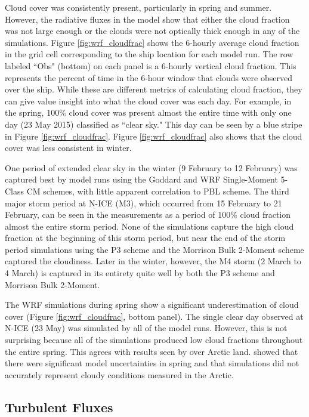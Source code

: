 Cloud cover was consistently present, particularly in spring and summer. However, the radiative fluxes in the model show that either the cloud fraction was not large enough or the clouds were not optically thick enough in any of the simulations. Figure \ref{fig:wrf_cloudfrac} shows the 6-hourly average cloud fraction in the grid cell corresponding to the ship location for each model run. The row labeled ``Obs" (bottom) on each panel is a 6-hourly vertical cloud fraction. This represents the percent of time in the 6-hour window that clouds were observed over the ship. While these are different metrics of calculating cloud fraction, they can give value insight into what the cloud cover was each day. For example, in the spring, 100$\%$ cloud cover was present almost the entire time with only one day (23 May 2015) classified as ``clear sky." This day can be seen by a blue stripe in Figure \ref{fig:wrf_cloudfrac}. Figure \ref{fig:wrf_cloudfrac} also shows that the cloud cover was less consistent in winter. 

One period of extended clear sky in the winter (9 February to 12 February) was captured best by model runs using the Goddard and WRF Single-Moment 5-Class CM schemes, with little apparent correlation to PBL scheme. The third major storm period at N-ICE (M3), which occurred from 15 February to 21 February, can be seen in the measurements as a period of 100$\%$ cloud fraction almost the entire storm period. None of the simulations capture the high cloud fraction at the beginning of this storm period, but near the end of the storm period simulations using the P3 scheme and the Morrison Bulk 2-Moment scheme captured the cloudiness. Later in the winter, however, the M4 storm (2 March to 4 March) is captured in its entirety quite well by both the P3 scheme and Morrison Bulk 2-Moment. 

The WRF simulations during spring show a significant underestimation of cloud cover (Figure \ref{fig:wrf_cloudfrac}, bottom panel). The single clear day observed at N-ICE (23 May) was simulated by all of the model runs. However, this is not surprising because all of the simulations produced low cloud fractions throughout the entire spring. This agrees with results seen by \citet{hines:2011} over Arctic land. \citet{hines:2011} showed that there were significant model uncertainties in spring and that simulations did not accurately represent cloudy conditions measured in the Arctic. 

\subsection{Turbulent Fluxes}

